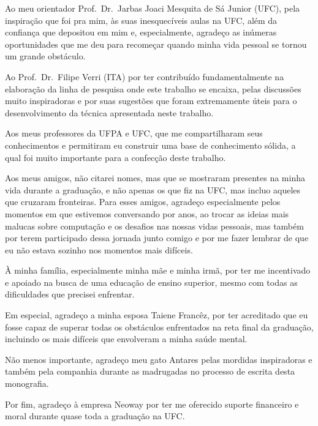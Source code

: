 Ao meu orientador Prof.\ Dr.\ Jarbas Joaci Mesquita de Sá Junior
(UFC), pela inspiração que foi pra mim, às suas inesquecíveis aulas na
UFC, além da confiança que depositou em mim e, especialmente, agradeço
as inúmeras oportunidades que me deu para recomeçar quando minha vida
pessoal se tornou um grande obstáculo.

Ao Prof.\ Dr.\ Filipe Verri (ITA) por ter contribuído fundamentalmente
na elaboração da linha de pesquisa onde este trabalho se encaixa,
pelas discussões muito inspiradoras e por suas sugestões que foram
extremamente úteis para o desenvolvimento da técnica apresentada neste
trabalho.

Aos meus professores da UFPA e UFC, que me compartilharam seus
conhecimentos e permitiram eu construir uma base de conhecimento
sólida, a qual foi muito importante para a confecção deste trabalho.

Aos meus amigos, não citarei nomes, mas que se mostraram presentes na
minha vida durante a graduação, e não apenas os que fiz na UFC, mas
incluo aqueles que cruzaram fronteiras. Para esses amigos, agradeço
especialmente pelos momentos em que estivemos conversando por anos, ao
trocar as ideias mais malucas sobre computação e os desafios nas
nossas vidas pessoais, mas também por terem participado dessa jornada
junto comigo e por me fazer lembrar de que eu não estava sozinho nos
momentos mais difíceis.

À minha família, especialmente minha mãe e minha irmã, por ter me
incentivado e apoiado na busca de uma educação de ensino superior, mesmo
com todas as dificuldades que precisei enfrentar.

Em especial, agradeço a minha esposa Taiene Francêz, por ter
acreditado que eu fosse capaz de superar todas os obstáculos
enfrentados na reta final da graduação, incluindo os mais difíceis que
envolveram a minha saúde mental.

Não menos importante, agradeço meu gato Antares pelas mordidas
inspiradoras e também pela companhia durante as madrugadas no processo
de escrita desta monografia.

Por fim, agradeço à empresa Neoway por ter me oferecido suporte financeiro e moral
durante quase toda a graduação na UFC.\@
